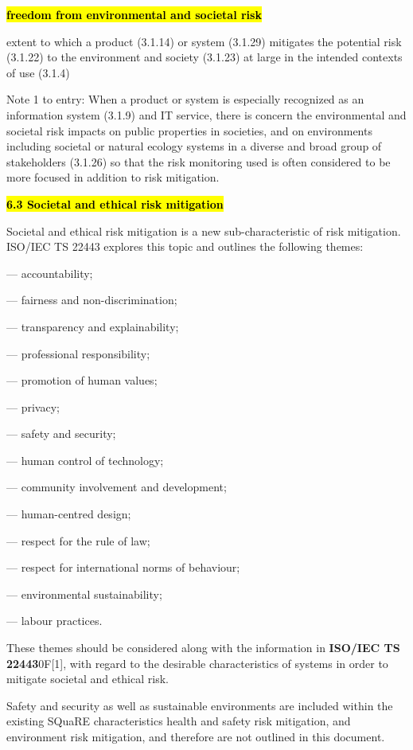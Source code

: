 \documentclass[
  letterpaper,
  DIV=11,
  numbers=noendperiod,
  oneside]{scrreprt}
\begin{document}
\begin{tcolorbox}
\textbf{\hl{freedom from environmental and societal risk}}

extent to which a product (3.1.14) or system (3.1.29) mitigates the
potential risk (3.1.22) to the environment and society (3.1.23) at large
in the intended contexts of use (3.1.4)

Note 1 to entry: When a product or system is especially recognized as an
information system (3.1.9) and IT service, there is concern the
environmental and societal risk impacts on public properties in
societies, and on environments including societal or natural ecology
systems in a diverse and broad group of stakeholders (3.1.26) so that
the risk monitoring used is often considered to be more focused in
addition to risk mitigation.

\textbf{\hl{6.3 Societal and ethical risk mitigation}}

Societal and ethical risk mitigation is a new sub-characteristic of risk
mitigation. ISO/IEC TS 22443 explores this topic and outlines the
following themes:

--- accountability;

--- fairness and non-discrimination;

--- transparency and explainability;

--- professional responsibility;

--- promotion of human values;

--- privacy;

--- safety and security;

--- human control of technology;

--- community involvement and development;

--- human-centred design;

--- respect for the rule of law;

--- respect for international norms of behaviour;

--- environmental sustainability;

--- labour practices.

These themes should be considered along with the information in
\textbf{ISO/IEC TS 22443}0F{[}1{]}, with regard to the desirable
characteristics of systems in order to mitigate societal and ethical
risk.

Safety and security as well as sustainable environments are included
within the existing SQuaRE characteristics health and safety risk
mitigation, and environment risk mitigation, and therefore are not
outlined in this document.


\end{tcolorbox}
\end{document}
